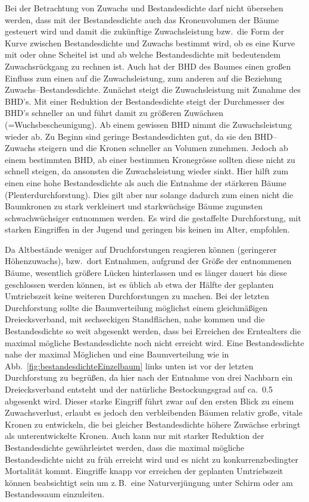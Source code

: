 \documentclass[twocolumn]{scrartcl}
\begin{document}
Bei der Betrachtung von Zuwachs und Bestandesdichte darf nicht übersehen werden,
dass mit der Bestandesdichte auch das Kronenvolumen der Bäume gesteuert wird und
damit die zukünftige Zuwachsleistung bzw.\ die Form der Kurve zwischen
Bestandesdichte und Zuwachs bestimmt wird, ob es eine Kurve mit oder ohne
Scheitel ist und ab welche Bestandesdichte mit bedeutendem Zuwachsrückgang zu
rechnen ist. Auch hat der BHD des Baumes einen großen Einfluss zum einen auf die
Zuwachsleistung, zum anderen auf die Beziehung Zuwachs--Bestandesdichte.
Zunächst steigt die Zuwachsleistung mit Zunahme des BHD's. Mit einer Reduktion
der Bestandesdichte steigt der Durchmesser des BHD's schneller an und führt
damit zu größeren Zuwächsen (=Wuchsbescheunigung). Ab einem gewissen BHD nimmt
die Zuwachsleistung wieder ab. Zu Beginn sind geringe Bestandesdichten gut, da
sie den BHD--Zuwachs steigern und die Kronen schneller an Volumen zunehmen.
Jedoch ab einem bestimmten BHD, ab einer bestimmen Kronegrösse sollten diese
nicht zu schnell steigen, da ansonsten die Zuwachsleistung wieder sinkt. Hier
hilft zum einen eine hohe Bestandesdichte als auch die Entnahme der stärkeren
Bäume (Plenterdurchforstung). Dies gilt aber nur solange dadurch zum einen nicht
die Baumkronen zu stark verkleinert und starkwüchsige Bäume zugunsten
schwachwüchsiger entnommen werden. Es wird die gestaffelte Durchforstung, mit
starken Eingriffen in der Jugend und geringen bis keinen im Alter, empfohlen.

Da Altbestände weniger auf Druchforstungen reagieren können (geringerer
Höhenzuwachs), bzw.\ dort Entnahmen, aufgrund der Größe der entnommenen Bäume,
wesentlich größere Lücken hinterlassen und es länger dauert bis diese
geschlossen werden können, ist es üblich ab etwa der Hälfte der geplanten
Umtriebszeit keine weiteren Durchforstungen zu machen. Bei der letzten
Durchforstung sollte die Baumverteilung möglichst einem gleichmäßigen
Dreiecksverband, mit sechseckigen Standflächen, nahe kommen und die
Bestandesdichte so weit abgesenkt werden, dass bei Erreichen des Erntealters die
maximal mögliche Bestandesdichte noch nicht erreicht wird. Eine Bestandesdichte
nahe der maximal Möglichen und eine Baumverteilung wie in
Abb.~\ref{fig:bestandesdichteEinzelbaum} links unten ist vor der letzten
Durchforstung zu begrüßen, da hier nach der Entnahme von drei Nachbarn ein
Dreiecksverband entsteht und der natürliche Bestockungsgrad auf ca.\ 0.5
abgesenkt wird. Dieser starke Eingriff führt zwar auf den ersten Blick zu einem
Zuwachsverlust, erlaubt es jedoch den verbleibenden Bäumen relativ große, vitale
Kronen zu entwickeln, die bei gleicher Bestandesdichte höhere Zuwächse erbringt
als unterentwickelte Kronen. Auch kann nur mit starker Reduktion der
Bestandesdichte gewährleistet werden, dass die maximal mögliche Bestandesdichte
nicht zu früh erreicht wird und es nicht zu konkurrenzbedingter Mortalität
kommt. Eingriffe knapp vor erreichen der geplanten Umtriebszeit können
beabsichtigt sein um z.\,B.\ eine Naturverjüngung unter Schirm oder am
Bestandessaum einzuleiten.
\end{document}
